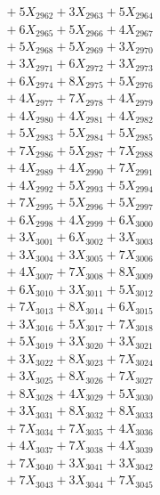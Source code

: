 \documentclass[a4paper,10pt]{article}
\begin{document}
{\begin{align}
&\;  + 5 X_{2962} + 3 X_{2963} + 5 X_{2964} \\[0.3ex]
&\;  + 6 X_{2965} + 5 X_{2966} + 4 X_{2967} \\[0.3ex]
&\;  + 5 X_{2968} + 5 X_{2969} + 3 X_{2970} \\[0.3ex]
&\;  + 3 X_{2971} + 6 X_{2972} + 3 X_{2973} \\[0.3ex]
&\;  + 6 X_{2974} + 8 X_{2975} + 5 X_{2976} \\[0.3ex]
&\;  + 4 X_{2977} + 7 X_{2978} + 4 X_{2979} \\[0.5ex]\allowbreak
&\;  + 4 X_{2980} + 4 X_{2981} + 4 X_{2982} \\[0.3ex]
&\;  + 5 X_{2983} + 5 X_{2984} + 5 X_{2985} \\[0.3ex]
&\;  + 7 X_{2986} + 5 X_{2987} + 7 X_{2988} \\[0.3ex]
&\;  + 4 X_{2989} + 4 X_{2990} + 7 X_{2991} \\[0.3ex]
&\;  + 4 X_{2992} + 5 X_{2993} + 5 X_{2994} \\[0.3ex]
&\;  + 7 X_{2995} + 5 X_{2996} + 5 X_{2997} \\[0.3ex]
&\;  + 6 X_{2998} + 4 X_{2999} + 6 X_{3000} \\[0.3ex]
&\;  + 3 X_{3001} + 6 X_{3002} + 3 X_{3003} \\[0.3ex]
&\;  + 3 X_{3004} + 3 X_{3005} + 7 X_{3006} \\[0.3ex]
&\;  + 4 X_{3007} + 7 X_{3008} + 8 X_{3009} \\[0.5ex]\allowbreak
&\;  + 6 X_{3010} + 3 X_{3011} + 5 X_{3012} \\[0.3ex]
&\;  + 7 X_{3013} + 8 X_{3014} + 6 X_{3015} \\[0.3ex]
&\;  + 3 X_{3016} + 5 X_{3017} + 7 X_{3018} \\[0.3ex]
&\;  + 5 X_{3019} + 3 X_{3020} + 3 X_{3021} \\[0.3ex]
&\;  + 3 X_{3022} + 8 X_{3023} + 7 X_{3024} \\[0.3ex]
&\;  + 3 X_{3025} + 8 X_{3026} + 7 X_{3027} \\[0.3ex]
&\;  + 8 X_{3028} + 4 X_{3029} + 5 X_{3030} \\[0.3ex]
&\;  + 3 X_{3031} + 8 X_{3032} + 8 X_{3033} \\[0.3ex]
&\;  + 7 X_{3034} + 7 X_{3035} + 4 X_{3036} \\[0.3ex]
&\;  + 4 X_{3037} + 7 X_{3038} + 4 X_{3039} \\[0.5ex]\allowbreak
&\;  + 7 X_{3040} + 3 X_{3041} + 3 X_{3042} \\[0.3ex]
&\;  + 7 X_{3043} + 3 X_{3044} + 7 X_{3045} \\[0.3ex]

\end{align}}
\end{document}
